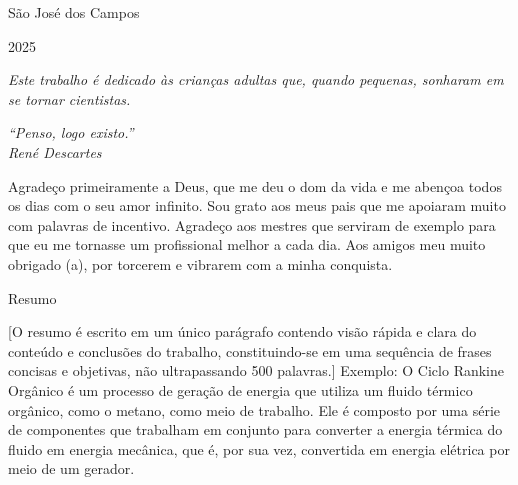 \documentclass[
  12pt,
  oneside,
  a4paper,
  english,
  brazil]{abntex2}
\begin{document}
\begin{center}

\vspace*{2.5cm}

{\large São José dos Campos}
\par
{\large 2025}

\end{center}

\newpage{}

\vspace*{\fill}

\hfill
\begin{minipage}{0.5\textwidth}
    \begin{flushright}
        \textit{ Este trabalho é dedicado às crianças adultas que, quando pequenas, sonharam em se tornar cientistas. }
    \end{flushright}
\end{minipage}

\vspace{2cm}

\newpage{}

\vspace*{\fill}

\hfill
\begin{minipage}{0.5\textwidth}
    \begin{flushright}
        \textit{ “Penso, logo existo.” } \\
        \textit{ René Descartes }
    \end{flushright}
\end{minipage}

\vspace{2cm}

\newpage{}

\begin{agradecimentos}

Agradeço primeiramente a Deus, que me deu o dom da vida e me abençoa todos os dias com o seu amor infinito. Sou grato aos meus pais que me apoiaram muito com palavras de incentivo. Agradeço aos mestres que serviram de exemplo para que eu me tornasse um profissional melhor a cada dia. Aos amigos meu muito obrigado (a), por torcerem e vibrarem com a minha conquista.

\end{agradecimentos}

\begin{center}
Resumo
\end{center}

{[}O resumo é escrito em um único parágrafo contendo visão rápida e
clara do conteúdo e conclusões do trabalho, constituindo-se em uma
sequência de frases concisas e objetivas, não ultrapassando 500
palavras.{]} Exemplo: O Ciclo Rankine Orgânico é um processo de geração
de energia que utiliza um fluido térmico orgânico, como o metano, como
meio de trabalho. Ele é composto por uma série de componentes que
trabalham em conjunto para converter a energia térmica do fluido em
energia mecânica, que é, por sua vez, convertida em energia elétrica por
meio de um gerador.
\end{document}
